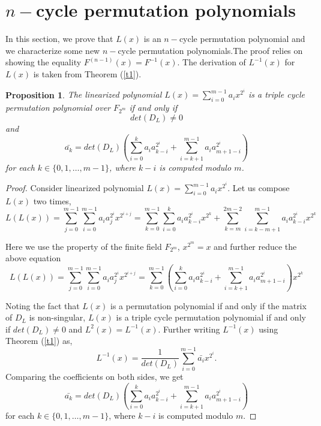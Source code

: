 \documentclass[12pt,a4paper]{article}
\newtheorem{proposition}{Proposition}[section]
\begin{document}
\section{$ n-$cycle permutation polynomials}\label{sec2}


In this section, we prove that $ L(x) $ is an $ n-$cycle permutation polynomial and we characterize some new $ n-$cycle permutation polynomials.The proof relies on showing the equality $ F^{(n-1)}(x)=F^{-1}(x) $. The derivation of $ L^{-1}(x)$ for $ L(x) $ is taken from Theorem (\ref{t1}).

\begin{proposition}\label{p11}
    The linearized polynomial $ L(x)=\sum\limits_{i=0}^{m-1}a_{i}x^{2^{i}} $ is a triple cycle permutation polynomial over $ F_{2^{m}} $ if and only if 
    \begin{equation}
		det(D_{L})\not=0 
  \end{equation}and
 \begin{equation}
       \bar{a_k}=det(D_L) \left(\sum\limits_{i=0}^{k}a_ia_{k-i}^{2^i}+\sum\limits_{i=k+1}^{m-1}a_ia_{m+1-i}^{2^i}\right)
    \end{equation}
    for each $ k\in \{0,1,\ldots,m-1\} $, where $ k-i $ is computed modulo $ m $.
\end{proposition}
\begin{proof}
    Consider linearized polynomial $ L(x)=\sum\limits_{i=0}^{m-1}a_{i}x^{2^{i}} $. Let us compose $L(x)$ two times,
    \begin{equation}
        L(L(x))=\sum\limits_{j=0}^{m-1}\sum\limits_{i=0}^{m-1}a_ia_j^{2^i}x^{2^{i+j}}=\sum\limits_{k=0}^{m-1}\sum\limits_{i=0}^{k}a_ia_{k-i}^{2^i}x^{2^k}+\sum\limits_{k=m}^{2m-2}\sum\limits_{i=k-m+1}^{m-1}a_ia_{k-i}^{2^i}x^{2^k}
    \end{equation}

    Here we use the property of the finite field $ F_{2^{m}} $, $x^{2^m}=x$ and further reduce the above equation \begin{equation}
        L(L(x))=\sum\limits_{j=0}^{m-1}\sum\limits_{i=0}^{m-1}a_ia_j^{2^i}x^{2^{i+j}}=\sum\limits_{k=0}^{m-1}\left(\sum\limits_{i=0}^{k}a_ia_{k-i}^{2^i}+\sum\limits_{i=k+1}^{m-1}a_ia_{m+1-i}^{2^i}\right)x^{2^k}
    \end{equation}
   
    Noting the fact that $ L(x) $ is a permutation polynomial if and only if the matrix of $ D_{L} $ is non-singular, $ L(x) $ is a triple cycle permutation polynomial if and only if $ det(D_{L})\not=0 $ and $ L^{2}(x)=L^{-1}(x) $. Further writing $L^{-1}(x) $ using Theorem (\ref{t1}) as,    
	\begin{equation}
		L^{-1}(x)=\frac{1}{det(D_{L})}\sum\limits_{i=0}^{m-1}\bar{a_{i}}x^{2^{i}}.
	\end{equation}
	Comparing the coefficients on both sides, we get
    \begin{equation}
       \bar{a_k}=det(D_L) \left(\sum\limits_{i=0}^{k}a_ia_{k-i}^{2^i}+\sum\limits_{i=k+1}^{m-1}a_ia_{m+1-i}^{2^i}\right)
    \end{equation}
    for each $ k\in \{0,1,\ldots,m-1\} $, where $ k-i $ is computed modulo $ m $.
\end{proof}
\end{document}
